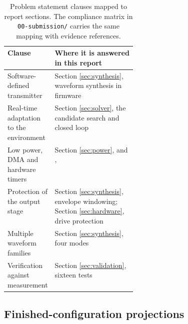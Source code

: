 \documentclass[conference,a4paper]{IEEEtran}
\begin{document}
\begin{table}[t]
\centering
\small
\begin{tabularx}{\linewidth}{L{0.30\linewidth}Y}
\toprule
\textbf{Clause} & \textbf{Where it is answered in this report} \\
\midrule
Software-defined transmitter & Section \ref{sec:synthesis}, waveform synthesis in firmware \\
Real-time adaptation to the environment & Section \ref{sec:solver}, the candidate search and closed loop \\
Low power, DMA and hardware timers & Section \ref{sec:power}, and ,  \\
Protection of the output stage & Section \ref{sec:synthesis}, envelope windowing; Section \ref{sec:hardware}, drive protection \\
Multiple waveform families & Section \ref{sec:synthesis}, four modes \\
Verification against measurement & Section \ref{sec:validation}, sixteen tests \\
\bottomrule
\end{tabularx}
\caption{Problem statement clauses mapped to report sections. The compliance
matrix in \texttt{00-submission/} carries the same mapping with evidence
references.}
\end{table}

\subsection{Finished-configuration projections}

\end{document}
